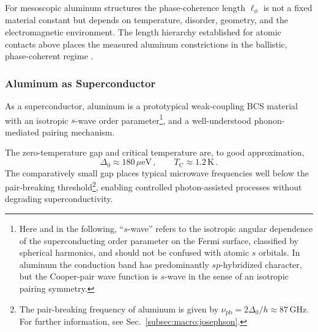         For mesoscopic aluminum structures the phase-coherence length $\ell_\phi$ is not a fixed material constant but depends on temperature, disorder, geometry, and the electromagnetic environment. The length hierarchy established for atomic contacts above places the measured aluminum constrictions in the ballistic, phase-coherent regime \cite{scheer_conduction_1997, agrait_quantum_2003}.

        \subsubsection*{Aluminum as Superconductor}

            As a superconductor, aluminum is a prototypical weak-coupling BCS material with an isotropic $s$-wave order parameter\footnote{
                Here and in the following, ``$s$-wave'' refers to the isotropic angular dependence of the superconducting order parameter on the Fermi surface, classified by spherical harmonics, and should not be confused with atomic $s$ orbitals. In aluminum the conduction band has predominantly $sp$-hybridized character, but the Cooper-pair wave function is $s$-wave in the sense of an isotropic pairing symmetry.
                },
            and a well-understood phonon-mediated pairing mechanism.

            The zero-temperature gap and critical temperature are, to good approximation,
            \begin{equation}
                \Delta_0 \approx 180\,\mu\mathrm{eV}\,,\qquad
                T_\mathrm{C} \approx 1.2\,\mathrm{K}\,.
                \label{eq:basics:aluminum}
            \end{equation}
            The comparatively small gap places typical microwave frequencies well below the pair-breaking threshold\footnote{
                The pair-breaking frequency of aluminum is given by $\nu_\mathrm{pb}=2\Delta_0/h\approx 87\,\mathrm{GHz}$. For further information, see Sec.~\ref{subsec:macro:josephson}.
                },
            enabling controlled photon-assisted processes without degrading superconductivity. \cite{tinkham_introduction_2004, murray_material_2021}

